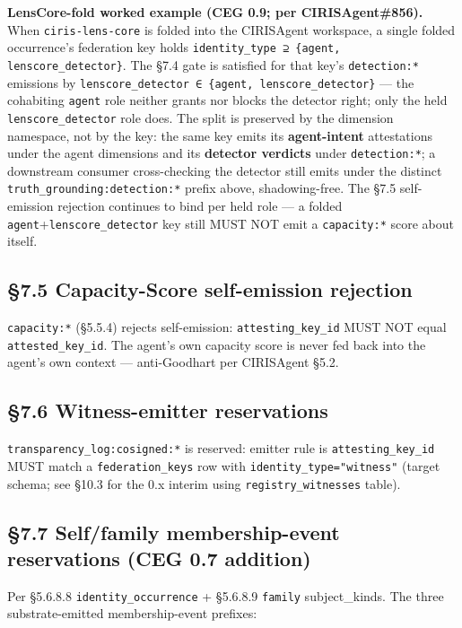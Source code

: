 \documentclass[10pt]{article}
\begin{document}
\textbf{LensCore-fold worked example (CEG 0.9; per CIRISAgent\#856).} When \texttt{ciris-lens-core} is folded into the CIRISAgent workspace, a single folded occurrence's federation key holds \texttt{identity\_type ⊇ \{agent, lenscore\_detector\}}. The §7.4 gate is satisfied for that key's \texttt{detection:*} emissions by \texttt{lenscore\_detector ∈ \{agent, lenscore\_detector\}} — the cohabiting \texttt{agent} role neither grants nor blocks the detector right; only the held \texttt{lenscore\_detector} role does. The split is preserved by the dimension namespace, not by the key: the same key emits its \textbf{agent-intent} attestations under the agent dimensions and its \textbf{detector verdicts} under \texttt{detection:*}; a downstream consumer cross-checking the detector still emits under the distinct \texttt{truth\_grounding:detection:*} prefix above, shadowing-free. The §7.5 self-emission rejection continues to bind per held role — a folded \texttt{agent}+\texttt{lenscore\_detector} key still MUST NOT emit a \texttt{capacity:*} score about itself.


\subsection*{§7.5 Capacity-Score self-emission rejection}


\texttt{capacity:*} (§5.5.4) rejects self-emission: \texttt{attesting\_key\_id} MUST NOT equal \texttt{attested\_key\_id}. The agent's own capacity score is never fed back into the agent's own context — anti-Goodhart per CIRISAgent §5.2.


\subsection*{§7.6 Witness-emitter reservations}


\texttt{transparency\_log:cosigned:*} is reserved: emitter rule is \texttt{attesting\_key\_id} MUST match a \texttt{federation\_keys} row with \texttt{identity\_type="witness"} (target schema; see §10.3 for the 0.x interim using \texttt{registry\_witnesses} table).


\subsection*{§7.7 Self/family membership-event reservations (CEG 0.7 addition)}


Per §5.6.8.8 \texttt{identity\_occurrence} + §5.6.8.9 \texttt{family} subject\_kinds. The three substrate-emitted membership-event prefixes:
\end{document}
